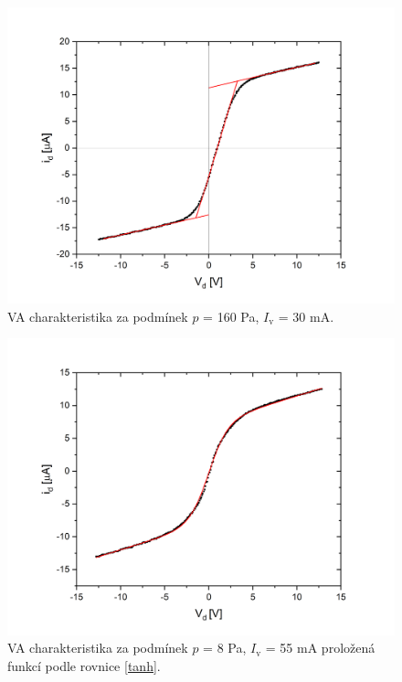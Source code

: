 \documentclass[a4paper,12pt]{article}
\begin{document}
\begin{figure}[h!]
	\centering
	\includegraphics[width=130mm]{dvojna4.png}
	\caption{VA charakteristika za podmínek $p$ = 160 \si{\pascal}, $I_\text{{v}}$ = 30 \si{\milli\ampere}.}
	\label{dvojna4}
\end{figure}

\newpage
\begin{figure}[h!]
	\centering
	\includegraphics[width=130mm]{tanh1.png}
	\caption{VA charakteristika za podmínek $p$ = 8 \si{\pascal}, $I_\text{{v}}$ = 55 \si{\milli\ampere} proložená funkcí podle rovnice \eqref{tanh}.}
	\label{tanh1}
\end{figure}
\end{document}

